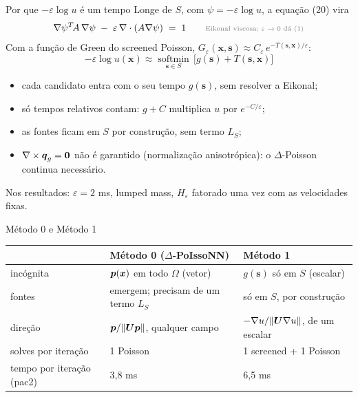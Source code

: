 \begin{frame}{Por que $-\varepsilon\log u$ é um tempo}
  \small
  Longe de $S$, com $\psi = -\varepsilon\log u$, a equação (20) vira
  \[
    \nabla\psi^{T}\!A\,\nabla\psi \;-\; \varepsilon\,\nabla\cdot(A\nabla\psi) \;=\; 1
    \qquad\text{\nota{Eikonal viscosa; $\varepsilon \to 0$ dá (1)}}
  \]
  Com a função de Green do screened Poisson, $G_\varepsilon(\boldsymbol{x},\boldsymbol{s}) \approx C_\varepsilon\, e^{-T(\boldsymbol{s},\boldsymbol{x})/\varepsilon}$:
  \[
    -\varepsilon\log u(\boldsymbol{x}) \approx \operatorname*{softmin}_{\boldsymbol{s}\in S}\,
      \bigl[g(\boldsymbol{s}) + T(\boldsymbol{s},\boldsymbol{x})\bigr]
  \]
  \vspace{-0.6em}
  \begin{itemize}\setlength{\itemsep}{0.1em}\footnotesize
    \item cada candidato entra com o seu tempo $g(\boldsymbol{s})$, sem resolver a Eikonal;
    \item só tempos relativos contam: $g + C$ multiplica $u$ por $e^{-C/\varepsilon}$;
    \item as fontes ficam em $S$ por construção, sem termo $L_S$;
    \item $\nabla\times\boldsymbol{q}_g = \boldsymbol{0}$ não é garantido (normalização anisotrópica): o $\Delta$-Poisson continua necessário.
  \end{itemize}
  \vspace{-0.3em}
  {\scriptsize\color{gray} Nos resultados: $\varepsilon = 2$ ms, lumped mass, $H_\varepsilon$ fatorado uma vez com as velocidades fixas.}
\end{frame}

\begin{frame}{Método 0 e Método 1}
  \small
  \renewcommand{\arraystretch}{1.35}
  \begin{tabular}{@{}p{}p{}p{}@{}}
    \toprule
    & Método 0 ($\Delta$-PoIssoNN) & Método 1 \\
    \midrule
    incógnita & $\boldsymbol{p}(\boldsymbol{x})$ em todo $\Omega$ (vetor) & $g(\boldsymbol{s})$ só em $S$ (escalar) \\
    fontes & emergem; precisam de um termo $L_S$ & só em $S$, por construção \\
    direção & $\boldsymbol{p}/\|\boldsymbol{U}\boldsymbol{p}\|$, qualquer campo & $-\nabla u/\|\boldsymbol{U}\nabla u\|$, de um escalar \\
    solves por iteração & 1 Poisson & 1 screened + 1 Poisson \\
    tempo por iteração (pac2) & 3,8 ms & 6,5 ms \\
    \bottomrule
  \end{tabular}
\end{frame}
